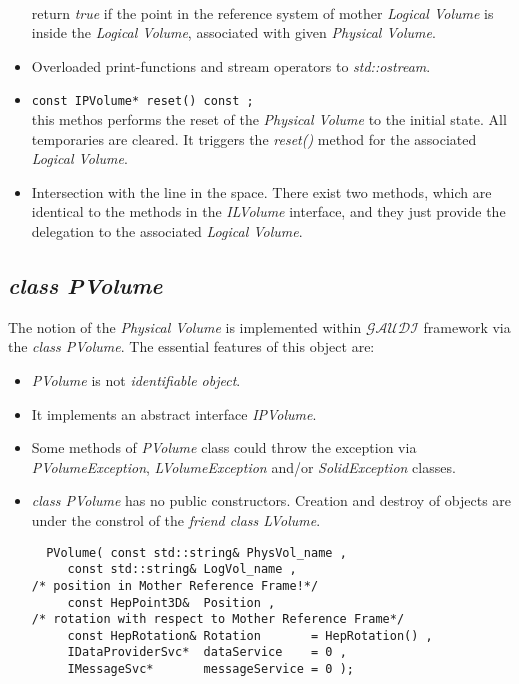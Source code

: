 \begin{itemize}
\\ return {\it true} if the point in the reference system of mother {\it Logical Volume} 
is inside the {\it Logical Volume}, associated with given {\it Physical Volume}.  
\item Overloaded print-functions and stream operators to {\it std::ostream}.
\item 
\verb+const IPVolume* reset() const ;+
\\ this methos performs the reset of the {\it Physical Volume} to the initial state.
All temporaries are cleared. It triggers the {\it reset()} method for the 
associated {\it Logical Volume}.
\item Intersection with the line in the space. There exist two methods, which are identical 
to the methods in the {\it ILVolume} interface, and they just provide 
the delegation to the associated {\it Logical Volume}.  

\end{itemize} 


\subsection{ {\it class PVolume} } 
The notion of the {\it Physical Volume } is implemented within 
${\mathcal{GAUDI}}$ framework via the {\it class PVolume}. 
The essential features of this object are:
\begin{itemize}
\item {\it PVolume} is not {\it identifiable object}. 
\item It implements an abstract interface {\it IPVolume}.  
\item Some methods of {\it PVolume} class could throw 
the exception via {\it PVolumeException},
{\it LVolumeException} and/or {\it SolidException} classes.
\item {\it class PVolume} has no public constructors. Creation and destroy of 
objects are under the constrol of the {\it friend class LVolume}.  
\begin{verbatim}
  PVolume( const std::string& PhysVol_name ,
     const std::string& LogVol_name ,
/* position in Mother Reference Frame!*/
     const HepPoint3D&  Position ,
/* rotation with respect to Mother Reference Frame*/
     const HepRotation& Rotation       = HepRotation() , 
     IDataProviderSvc*  dataService    = 0 , 
     IMessageSvc*       messageService = 0 );
\end{verbatim}
   
\end{itemize} 
  

